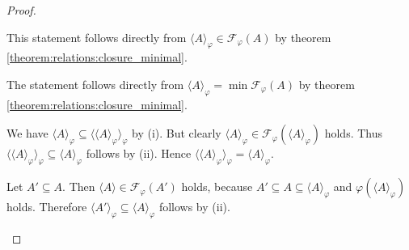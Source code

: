 \begin{proof}
    \begin{proofenumerate}
        \item This statement follows directly from $\langle A\rangle_\varphi\in\mathcal F_\varphi(A)$ by theorem \ref{theorem:relations:closure_minimal}.
        \item The statement follows directly from $\langle A\rangle_\varphi=\min\mathcal F_\varphi(A)$ by theorem \ref{theorem:relations:closure_minimal}.
        \item We have $\langle A\rangle_\varphi\subseteq \langle\langle A\rangle_\varphi\rangle_\varphi$ by (i). But clearly $\langle A\rangle_\varphi\in\mathcal F_\varphi(\langle A\rangle_\varphi)$ holds. Thus $\langle\langle A\rangle_\varphi\rangle_\varphi\subseteq \langle A\rangle_\varphi$ follows by (ii). Hence $\langle\langle A\rangle_\varphi\rangle_\varphi=\langle A\rangle_\varphi$.
        \item Let $A'\subseteq A$. Then $\langle A\rangle\in\mathcal F_\varphi(A')$ holds, because $A'\subseteq A\subseteq \langle A\rangle_\varphi$ and $\varphi(\langle A\rangle_\varphi)$ holds. Therefore $\langle A'\rangle_\varphi\subseteq\langle A\rangle_\varphi$ follows by (ii).
    \end{proofenumerate}
\end{proof}

